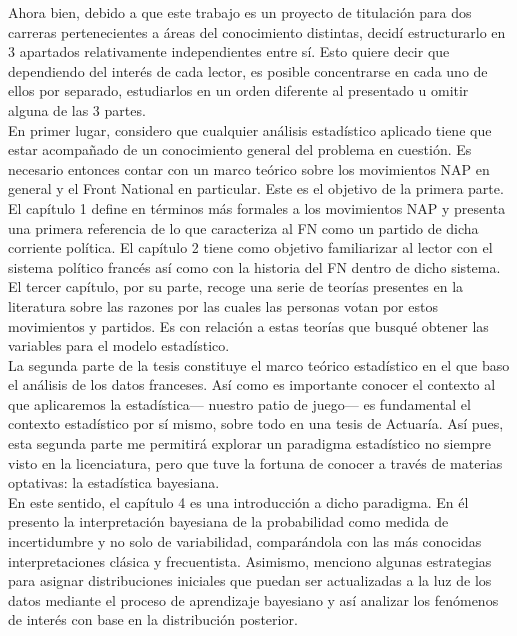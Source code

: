 Ahora bien, debido a que este trabajo es un proyecto de titulación para dos carreras pertenecientes a áreas del conocimiento distintas, decidí estructurarlo en 3 apartados relativamente independientes entre sí. Esto quiere decir que dependiendo del interés de cada lector, es posible concentrarse en cada uno de ellos por separado, estudiarlos en un orden diferente al presentado u omitir alguna de las 3 partes.\\ 

En primer lugar, considero que cualquier análisis estadístico aplicado tiene que estar acompañado de un conocimiento general del problema en cuestión. Es necesario entonces contar con un marco teórico sobre los movimientos NAP en general y el Front National en particular. Este es el objetivo de la primera parte. El capítulo 1 define en términos más formales a los movimientos NAP y presenta una primera referencia de lo que caracteriza al FN como un partido de dicha corriente política. El capítulo 2 tiene como objetivo familiarizar al lector con el sistema político francés así como con la historia del FN dentro de dicho sistema. El tercer capítulo, por su parte, recoge una serie de teorías presentes en la literatura sobre las razones por las cuales las personas votan por estos movimientos y partidos. Es con relación a estas teorías que busqué obtener las variables para el modelo estadístico.\\

La segunda parte de la tesis constituye el marco teórico estadístico en el que baso el análisis de los datos franceses. Así como es importante conocer el contexto al que aplicaremos la estadística--- nuestro patio de juego--- es fundamental el contexto estadístico por sí mismo, sobre todo en una tesis de Actuaría. Así pues, esta segunda parte me permitirá explorar un paradigma estadístico no siempre visto en la licenciatura, pero que tuve la fortuna de conocer a través de materias optativas: la estadística bayesiana.\\ 

En este sentido, el capítulo 4 es una introducción a dicho paradigma. En él presento la interpretación bayesiana de la probabilidad como medida de incertidumbre y no solo de variabilidad, comparándola con las más conocidas interpretaciones clásica y frecuentista. Asimismo, menciono algunas estrategias para asignar distribuciones iniciales que puedan ser actualizadas a la luz de los datos mediante el proceso de aprendizaje bayesiano y así analizar los fenómenos de interés con base en la distribución posterior.\\ 

